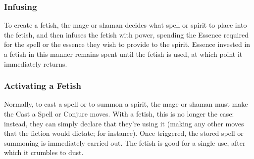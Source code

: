 \subsubsection{Infusing}
To create a fetish, the mage or shaman decides what spell or spirit to place into the fetish, and then infuses the fetish with power, spending the Essence required for the spell or the essence they wish to provide to the spirit. Essence invested in a fetish in this manner remains spent until the fetish is used, at which point it immediately returns.

\subsubsection{Activating a Fetish}
Normally, to cast a spell or to summon a spirit, the mage or shaman must make the Cast a Spell or Conjure moves. With a fetish, this is no longer the case: instead, they can simply declare that they’re using it (making any other moves that the fiction would dictate;  for instance). Once triggered, the stored spell or summoning is immediately carried out. The fetish is good for a single use, after which it crumbles to dust.
